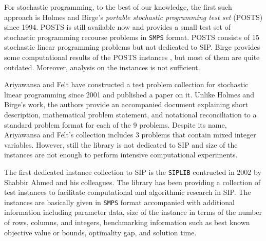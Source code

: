 For stochastic programming, to the best of our knowledge, the first such approach is Holmes and Birge's \textit{portable stochastic programming test set} (POSTS) \cite{POSTS} since 1994. POSTS is still available now and provides a small test set of stochastic programming recourse problems in \texttt{SMPS} format. POSTS consists of 15 stochastic linear programming problems but not dedicated to SIP. Birge provides some computational results of the POSTS instances \cite{POSTSresults}, but most of them are quite outdated. Moreover, analysis on the instances is not sufficient. 

Ariyawansa and Felt \cite{AF2004} have constructed a test problem collection for stochastic linear programming since 2001 and published a paper on it. Unlike Holmes and Birge's work, the authors provide an accompanied document explaining short description, mathematical problem statement, and notational reconciliation to a standard problem format for each of the 9 problems. Despite its name, Ariyawansa and Felt's collection includes 3 problems that contain mixed integer variables. However, still the library is not dedicated to SIP and size of the instances are not enough to perform intensive computational experiments. 

The first dedicated instance collection to SIP is the \texttt{SIPLIB} \cite{web:SIPLIB1} contructed in 2002 by Shabbir Ahmed and his colleagues. The library has been providing a collection of test instances to facilitate computational and algorithmic research in SIP. The instances are basically given in \texttt{SMPS} format accompanied with additional information including parameter data, size of the instance in terms of the number of rows, columns, and integers, benchmarking information such as best known objective value or bounds, optimality gap, and solution time. 

